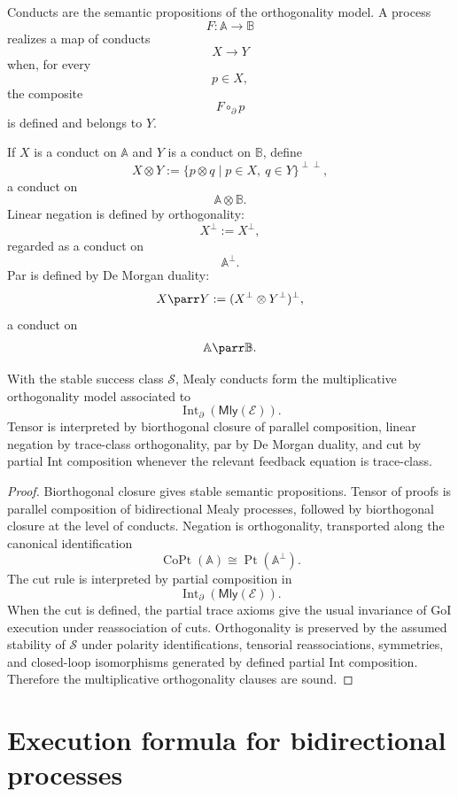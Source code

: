 Conducts are the semantic propositions of the orthogonality model.  A process
\[
F:\mathbb A\to\mathbb B
\]
realizes a map of conducts
\[
X\to Y
\]
when, for every
\[
p\in X,
\]
the composite
\[
F\circ_{\partial}p
\]
is defined and belongs to \(Y\).

If \(X\) is a conduct on \(\mathbb A\) and \(Y\) is a conduct on
\(\mathbb B\), define
\[
X\otimes Y
:=
\{p\otimes q\mid p\in X,\ q\in Y\}^{\perp\perp},
\]
a conduct on
\[
\mathbb A\otimes\mathbb B.
\]
Linear negation is defined by orthogonality:
\[
X^\bot:=X^\perp,
\]
regarded as a conduct on
\[
\mathbb A^\bot.
\]
Par is defined by De Morgan duality:
\[
X\parr Y:=(X^\bot\otimes Y^\bot)^\bot,
\]
a conduct on
\[
\mathbb A\parr\mathbb B.
\]

\begin{theorem}
\label{thm:conduct-semantics-partial-linear-logic}
With the stable success class \(\mathcal S\), Mealy conducts form the
multiplicative orthogonality model associated to
\[
\operatorname{Int}_{\partial}(\mathsf{Mly}(\mathcal E)).
\]
Tensor is interpreted by biorthogonal closure of parallel composition, linear
negation by trace-class orthogonality, par by De Morgan duality, and cut by
partial Int composition whenever the relevant feedback equation is
trace-class.
\end{theorem}

\begin{proof}
Biorthogonal closure gives stable semantic propositions.  Tensor of proofs is
parallel composition of bidirectional Mealy processes, followed by
biorthogonal closure at the level of conducts.  Negation is orthogonality,
transported along the canonical identification
\[
\operatorname{CoPt}(\mathbb A)
\cong
\operatorname{Pt}(\mathbb A^\bot).
\]
The cut rule is interpreted by partial composition in
\[
\operatorname{Int}_{\partial}(\mathsf{Mly}(\mathcal E)).
\]
When the cut is defined, the partial trace axioms give the usual invariance of
GoI execution under reassociation of cuts.  Orthogonality is preserved by the
assumed stability of \(\mathcal S\) under polarity identifications,
tensorial reassociations, symmetries, and closed-loop isomorphisms generated
by defined partial Int composition.  Therefore the multiplicative
orthogonality clauses are sound.
\end{proof}

\section{Execution formula for bidirectional processes}
\label{sec:execution-formula-bidirectional-processes}

